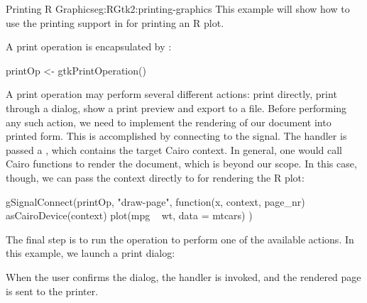 \begin{example}{Printing R Graphics}{eg:RGtk2:printing-graphics}
  This example will show how to use the printing support in \GTK\/ for
  printing an R plot. 
  
  A print operation is encapsulated by :
\begin{Schunk}
\begin{Sinput}
 printOp <- gtkPrintOperation()
\end{Sinput}
\end{Schunk}
%
A print operation may perform several different actions: print
directly, print through a dialog, show a print preview and export to a
file. Before performing any such action, we need to implement the
rendering of our document into printed form. This is accomplished by
connecting to the  signal. The handler is passed a
, which contains the target Cairo context. In
general, one would call Cairo functions to render the document, which
is beyond our scope. In this case, though, we can pass the context
directly to  for rendering the R plot:
\begin{Schunk}
\begin{Sinput}
 gSignalConnect(printOp, "draw-page", function(x, context, page_nr) {
   asCairoDevice(context)
   plot(mpg ~ wt, data = mtcars)
 })
\end{Sinput}
\end{Schunk}
%
  The final step is to run the operation to perform one of the
  available actions. In this example, we launch a print dialog:
\begin{Schunk}
\end{Schunk}
% 
  When the user confirms the dialog, the
   handler is invoked, and the
  rendered page is sent to the printer.
\end{example}

